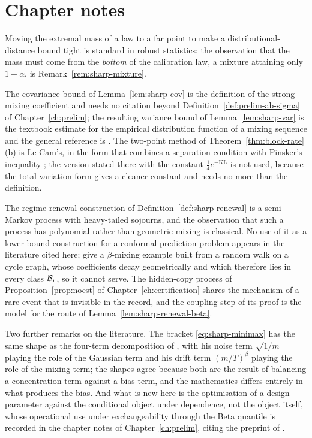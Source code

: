 \documentclass[../../../main.tex]{subfiles}
\begin{document}
\section{Chapter notes}\label{sec:sharp-notes}

Moving the extremal mass of a law to a far point to make a distributional-distance bound tight is standard in robust statistics; the observation that the mass must come from the \emph{bottom} of the calibration law, a mixture attaining only $1-\alpha$, is Remark~\ref{rem:sharp-mixture}.

The covariance bound of Lemma~\ref{lem:sharp-cov} is the definition of the strong mixing coefficient and needs no citation beyond Definition~\ref{def:prelim-ab-sigma} of Chapter~\ref{ch:prelim}; the resulting variance bound of Lemma~\ref{lem:sharp-var} is the textbook estimate for the empirical distribution function of a mixing sequence and the general reference is \citet{doukhan1994}. The two-point method of Theorem~\ref{thm:block-rate}(b) is Le Cam's, in the form that combines a separation condition with Pinsker's inequality \citep[\S2.3, \S2.4.1]{tsybakov2009}; the version stated there with the constant $\tfrac14e^{-\mathrm{KL}}$ is not used, because the total-variation form gives a cleaner constant and needs no more than the definition.

The regime-renewal construction of Definition~\ref{def:sharp-renewal} is a semi-Markov process with heavy-tailed sojourns, and the observation that such a process has polynomial rather than geometric mixing is classical. No use of it as a lower-bound construction for a conformal prediction problem appears in the literature cited here; \citet[Ex.~2, p.~12]{oliveira2024} give a $\beta$-mixing example built from a random walk on a cycle graph, whose coefficients decay geometrically and which therefore lies in every class $\mathcal B_{r}$, so it cannot serve. The hidden-copy process of Proposition~\ref{prop:noest} of Chapter~\ref{ch:certification} shares the mechanism of a rare event that is invisible in the record, and the coupling step of its proof is the model for the route of Lemma~\ref{lem:sharp-renewal-beta}.

Two further remarks on the literature. The bracket \eqref{eq:sharp-minimax} has the same shape as the four-term decomposition of \citet[Thm.~2]{halkiewicz2026}, with his noise term $\sqrt{1/m}$ playing the role of the Gaussian term and his drift term $(m/T)^\beta$ playing the role of the mixing term; the shapes agree because both are the result of balancing a concentration term against a bias term, and the mathematics differs entirely in what produces the bias. And what is new here is the optimisation of a design parameter against the conditional object under dependence, not the object itself, whose operational use under exchangeability through the Beta quantile is recorded in the chapter notes of Chapter~\ref{ch:prelim}, citing the preprint of \citet[Sec.~2.2]{zwart2025}.
\end{document}
